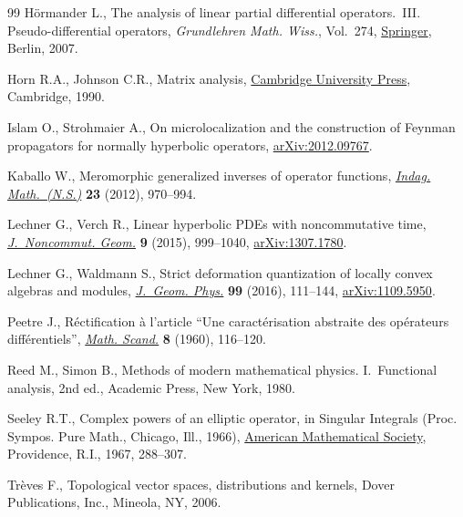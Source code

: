 \documentclass[pdftex]{sigma}
\numberwithin{equation}{section}
\begin{document}
\begin{thebibliography}{99}
H\"ormander L., The analysis of linear partial differential operators.~{III}.
 Pseudo-differential operators, \textit{Grundlehren Math. Wiss.}, Vol.~274,
 \href{https://doi.org/10.1007/978-3-540-49938-1}{Springer}, Berlin, 2007.

Horn R.A., Johnson C.R., Matrix analysis, \href{https://doi.org/10.1017/CBO9780511810817}{Cambridge University Press},
 Cambridge, 1990.

Islam O., Strohmaier A., On microlocalization and the construction of {F}eynman
 propagators for normally hyperbolic operators, \href{https://arxiv.org/abs/2012.09767}{arXiv:2012.09767}.

Kaballo W., Meromorphic generalized inverses of operator functions,
 \href{https://doi.org/10.1016/j.indag.2012.05.001}{\textit{Indag. Math.~(N.S.)}} \textbf{23} (2012), 970--994.

Lechner G., Verch R., Linear hyperbolic {PDE}s with noncommutative time,
 \href{https://doi.org/10.4171/JNCG/214}{\textit{J.~Noncommut. Geom.}} \textbf{9} (2015), 999--1040,
 \href{https://arxiv.org/abs/1307.1780}{arXiv:1307.1780}.

Lechner G., Waldmann S., Strict deformation quantization of locally convex
 algebras and modules, \href{https://doi.org/10.1016/j.geomphys.2015.09.013}{\textit{J.~Geom. Phys.}} \textbf{99} (2016), 111--144,
 \href{https://arxiv.org/abs/1109.5950}{arXiv:1109.5950}.

Peetre J., R\'ectification \`a l'article ``{U}ne caract\'erisation abstraite
 des op\'erateurs diff\'erentiels'', \href{https://doi.org/10.7146/math.scand.a-10598}{\textit{Math. Scand.}} \textbf{8} (1960),
 116--120.

Reed M., Simon B., Methods of modern mathematical physics. {I}.~{F}unctional
 analysis, 2nd ed., Academic Press, New York, 1980.

Seeley R.T., Complex powers of an elliptic operator, in Singular {I}ntegrals
 ({P}roc. {S}ympos. {P}ure {M}ath., {C}hicago, {I}ll., 1966), \href{https://doi.org/10.1090/pspum/010/0237943}{American Mathematical Society}, Providence, R.I., 1967, 288--307.

Tr\`eves F., Topological vector spaces, distributions and kernels, Dover
 Publications, Inc., Mineola, NY, 2006.

\end{thebibliography}\LastPageEnding
\end{document}
